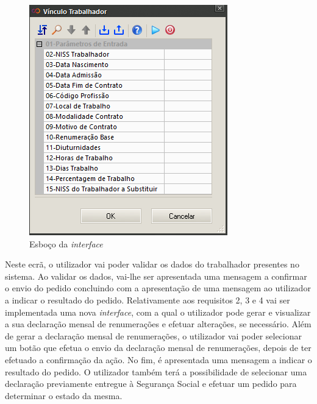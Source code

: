 \documentclass[sigplan]{acmart}
\begin{document}
\FloatBarrier
\begin{figure}[htbp]
	\centerline{\includegraphics[width=\linewidth]{figures/esboco_interface.png}}
	\caption{Esboço da \textit{interface}}
	\label{fig4}
\end{figure}
\FloatBarrier
Neste ecrã, o utilizador vai poder validar os dados do trabalhador presentes no sistema. Ao validar os dados, vai-lhe ser apresentada uma mensagem a confirmar o envio do pedido concluindo com a apresentação de uma mensagem ao utilizador a indicar o resultado do pedido. Relativamente aos requisitos 2, 3 e 4 vai ser implementada uma nova \textit{interface}, com a qual o utilizador pode gerar e visualizar a sua declaração mensal de renumerações e efetuar alterações, se necessário. Além de gerar a declaração mensal de renumerações, o utilizador vai poder selecionar um botão que efetua o envio da declaração mensal de renumerações, depois de ter efetuado a confirmação da ação. No fim, é apresentada uma mensagem a indicar o resultado do pedido. O utilizador também terá a possibilidade de selecionar uma declaração previamente entregue à Segurança Social e efetuar um pedido para determinar o estado da mesma.
\end{document}
